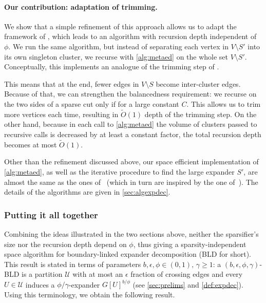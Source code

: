 \documentclass[epsfig,letter,11pt]{article}
\numberwithin{equation}{section}
\DeclareMathOperator{\vol}{vol}
\newcommand{\otil}{\tilde{O}}
\renewcommand{\tilde}{\widetilde}
\begin{document}
\paragraph{Our contribution: adaptation of trimming.} We show that a simple refinement of this approach allows us to adapt the framework of \cite{offlineexpdec}, which leads to an algorithm with recursion depth independent of  $\phi$. We run the same algorithm, but instead of separating each vertex in $V \setminus S'$ into its own singleton cluster, we recurse with \cref{alg:metaed} on the whole set $V \setminus S'$. Conceptually, this implements an analogue of the trimming step of \cite{offlineexpdec}.

This means that at the end, fewer edges in $V \setminus S$ become inter-cluster edges. Because of that,
we can strengthen the balancedness requirement: we recurse on the two sides of a sparse cut only if \smash{$\vol(S) \gtrsim \frac{1}{C} \vol(V \setminus S)$} for a large constant $C$. This allows us to trim more vertices each time, resulting in $\otil(1)$ depth of the trimming step.  On the other hand, because in each call to \cref{alg:metaed} the volume of clusters passed to recursive calls is decreased by at least a constant factor, the total recursion depth becomes at most $\otil(1)$.

Other than the refinement discussed above, our space efficient implementation of \cref{alg:metaed}, as well as  the iterative procedure to find the large expander $S'$, are almost the same as the ones of~\cite{streamexpdec} (which in turn are  inspired by the one of~\cite{triang}). The details of the algorithms are given in \cref{sec:algexpdec}.

\subsubsection*{Putting it all together}
Combining the ideas illustrated in the two sections above, neither the sparsifier's size nor the recursion depth depend on $\phi$, thus giving a sparsity-independent space algorithm for boundary-linked expander decomposition  (BLD for short). This result is stated in terms of parameters $b,\epsilon,\phi \in (0,1), \, \gamma \ge 1$: a $(b, \epsilon, \phi, \gamma)$-BLD is a partition $\mathcal{U}$ with  at most an $\epsilon$ fraction of crossing edges and every $U \in \mathcal{U}$ induces a $\phi/\gamma$-expander $G[U]^{b/\phi}$ (see \cref{sec:prelims} and \cref{def:expdec}). Using this terminology, we obtain the following result.
\end{document}
